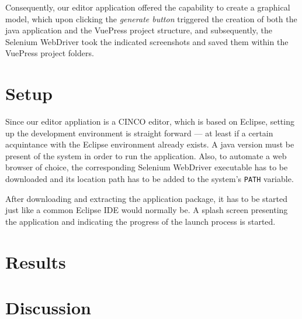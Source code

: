 Consequently, our editor application offered the capability to create a graphical model, which upon clicking the \textit{generate button} triggered the creation of both the java application and the VuePress project structure, and subsequently, the Selenium WebDriver took the indicated screenshots and saved them within the VuePress project folders.

\section{Setup}\label{sec:setup}

Since our editor appliation is a CINCO editor, which is based on Eclipse, setting up the development environment is straight forward --- at least if a certain acquintance with the Eclipse environment already exists. A java version must be present of the system in order to run the application. Also, to automate a web browser of choice, the corresponding Selenium WebDriver executable has to be downloaded and its location path has to be added to the system's \lstinline{PATH} variable.

After downloading and extracting the application package, it has to be started just like a common Eclipse IDE would normally be. A splash screen presenting the application and indicating the progress of the launch process is started. 

\section{Results}\label{sec:res}

\section{Discussion}\label{sec:disc}

